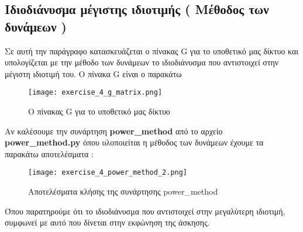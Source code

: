 \documentclass[First Project.tex]{subfiles}
\begin{document}
\subsection{ Ιδιοδιάνυσμα μέγιστης ιδιοτιμής ( Μέθοδος των δυνάμεων )}

Σε αυτή την παράγραφο κατασκευάζεται ο πίνακας \textlatin{G} για το υποθετικό μας δίκτυο και υπολογίζεται με την μέθοδο
των δυνάμεων το ιδιοδιάνυσμα που αντιστοιχεί στην μέγιστη ιδιοτιμή του. Ο πίνακα \textlatin{G} είναι ο παρακάτω 

\begin{figure}[h!]
    \centering
    \captionsetup{justification=centering}
    \begin{center}
        \texttt{[image: exercise\_4\_g\_matrix.png]}    
        \caption{ Ο πίνακας \textlatin{G} για το υποθετικό μας δίκτυο }
    \end{center}
\end{figure} 
\newpage
Αν καλέσουμε την συνάρτηση \textlatin{\textbf{power\_method}} από το αρχείο \textlatin{\textbf{power\_method.py}} όπου
υλοποιείται η μέθοδος των δυνάμεων έχουμε τα παρακάτω αποτελέσματα :
\begin{figure}[h!]
    \centering
    \captionsetup{justification=centering}
    \begin{center}
        \texttt{[image: exercise\_4\_power\_method\_2.png]}    
        \caption{ Αποτελέσματα κλήσης της συνάρτησης \textlatin{power\_method} }
    \end{center}
\end{figure} 

Όπου παρατηρούμε ότι το ιδιοδιάνυσμα που αντιστοιχεί στην μεγαλύτερη ιδιοτιμή, συμφωνεί με αυτό που δίνεται στην εκφώνηση
της άσκησης.
\end{document}
